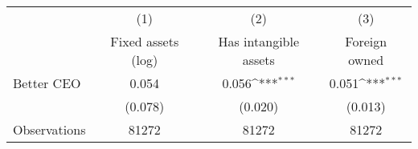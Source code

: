 {
\def\sym#1{\ifmmode^{#1}\else\(^{#1}\)\fi}
\begin{tabular}{l*{3}{c}}
\hline\hline
                    &\multicolumn{1}{c}{(1)}&\multicolumn{1}{c}{(2)}&\multicolumn{1}{c}{(3)}\\
                    &\multicolumn{1}{c}{Fixed assets (log)}&\multicolumn{1}{c}{Has intangible assets}&\multicolumn{1}{c}{Foreign owned}\\
\hline
Better CEO          &       0.054         &       0.056\sym{***}&       0.051\sym{***}\\
                    &     (0.078)         &     (0.020)         &     (0.013)         \\
\hline
Observations        &       81272         &       81272         &       81272         \\
\hline\hline
\end{tabular}
}
